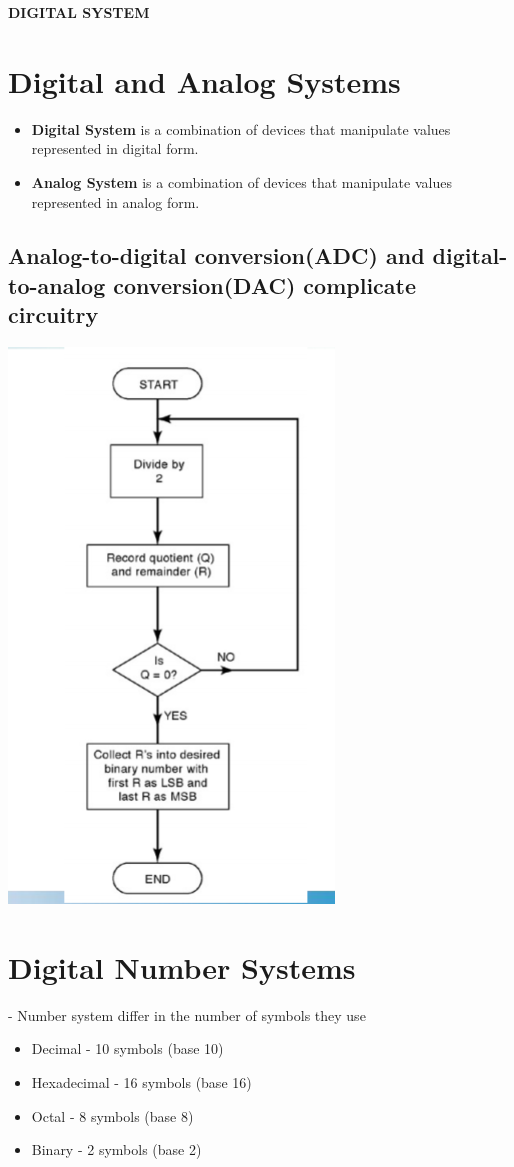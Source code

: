 \documentclass[12pt]{article}
\begin{document}
\begin{center}
\textbf{DIGITAL SYSTEM}
\end{center}
\section{Digital and Analog Systems}
\begin{itemize}
	\item \textbf{Digital System} is a combination of devices that manipulate values represented in digital form.
	\item \textbf{Analog System} is a combination of devices that manipulate values represented in analog form.
\end{itemize}
\subsection*{Analog-to-digital conversion(ADC) and digital-to-analog conversion(DAC) complicate circuitry}
\includegraphics[scale=0.75]{hinh}
\section{Digital Number Systems}
-  Number system differ in the number of symbols they use\\
\begin{itemize}
	\item  Decimal - 10 symbols (base 10)
	\item  Hexadecimal - 16 symbols (base 16)
	\item  Octal - 8 symbols (base 8)
	\item  Binary - 2 symbols (base 2)
\end{itemize}
\end{document}
